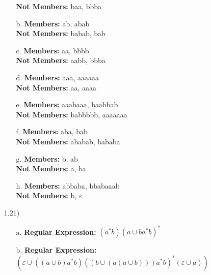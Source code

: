 \documentclass[12pt]{letter}
\begin{document}
\begin{itemize}
\begin{itemize}
                   \textbf{Not Members:} baa, bbba

        \item [b.] \textbf{Members:} ab, abab\\

                   \textbf{Not Members:} babab, bab

        \item [c.] \textbf{Members:} aa, bbbb\\

                   \textbf{Not Members:} aabb, bbba

        \item [d.] \textbf{Members:} aaa, aaaaaa\\

                   \textbf{Not Members:} aa, aaaa

        \item [e.] \textbf{Members:} aaabaaa, baabbab\\

                   \textbf{Not Members:} babbbbb, aaaaaaa

        \item [f.] \textbf{Members:} aba, bab\\

                   \textbf{Not Members:} ababab, bababa

        \item [g.] \textbf{Members:} b, ab\\

                   \textbf{Not Members:} a, ba

        \item [h.] \textbf{Members:} abbaba, bbabaaab\\

                   \textbf{Not Members:} b, $\varepsilon$

    \end{itemize}

    \item [1.21)]

    \begin{itemize}

        \item [a.] \textbf{Regular Expression:} $(a^*b)(a\cup ba^*b)^*$

        \item [b.] \textbf{Regular Expression:} $(\varepsilon\cup((a\cup b) a^* b)((b\cup(a(a\cup b)))a^*b)^*(\varepsilon\cup a))$


\end{itemize}
\end{itemize}
\end{document}
